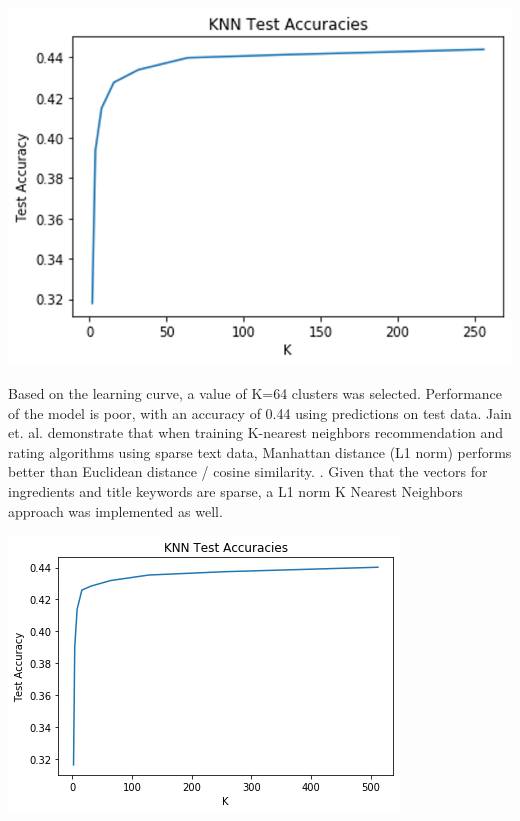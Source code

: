 \documentclass[sigconf]{acmart}
\begin{document}
\includegraphics[width=\linewidth]{knnlearningcurve.png}

Based on the learning curve, a value of K=64 clusters was selected. Performance of the model is poor, with an accuracy of 0.44 using predictions on test data. Jain et. al. demonstrate that when training K-nearest neighbors recommendation and rating algorithms using sparse text data, Manhattan distance (L1 norm) performs better than Euclidean distance / cosine similarity. \cite{RPL1Norm}. Given that the vectors for ingredients and title keywords are sparse, a L1 norm K Nearest Neighbors approach was implemented as well. 

\includegraphics[width=\linewidth]{l1norm.png}
\end{document}
